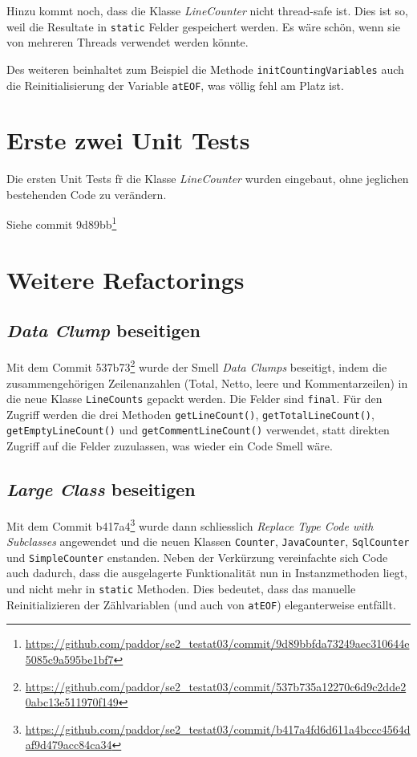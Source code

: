 \documentclass[a4paper]{article}
\newcommand{\java}[1]{\lstinline[style=customjava]{#1}} %
\begin{document}
Hinzu kommt noch, dass die Klasse \emph{LineCounter} nicht thread-safe ist.
Dies ist so, weil die Resultate in \java{static} Felder gespeichert werden. Es
w\"are sch\"on, wenn sie von mehreren Threads verwendet werden k\"onnte.

Des weiteren beinhaltet zum Beispiel die Methode \java{initCountingVariables}
auch die Reinitialisierung der Variable \java{atEOF}, was v\"ollig fehl am
Platz ist.

\section{Erste zwei Unit Tests}
Die ersten Unit Tests f\"r die Klasse \emph{LineCounter} wurden eingebaut, ohne jeglichen bestehenden Code zu ver\"andern.

Siehe commit 9d89bb\footnote{\url{https://github.com/paddor/se2_testat03/commit/9d89bbfda73249aec310644e5085c9a595be1bf7}}

\section{Weitere Refactorings}

\subsection{\emph{Data Clump} beseitigen}
Mit dem Commit
537b73\footnote{\url{https://github.com/paddor/se2_testat03/commit/537b735a12270c6d9c2dde20abc13e511970f149}}
wurde der Smell \emph{Data Clumps} beseitigt, indem die zusammengeh\"origen
Zeilenanzahlen (Total, Netto, leere und Kommentarzeilen) in die neue Klasse
\java{LineCounts} gepackt werden. Die Felder sind \java{final}. F\"ur den
Zugriff werden die drei Methoden \java{getLineCount()},
\java{getTotalLineCount()}, \java{getEmptyLineCount()} und
\java{getCommentLineCount()} verwendet, statt direkten Zugriff auf die Felder
zuzulassen, was wieder ein Code Smell w\"are.

\subsection{\emph{Large Class} beseitigen}
Mit dem Commit
b417a4\footnote{\url{https://github.com/paddor/se2_testat03/commit/b417a4fd6d611a4bccc4564daf9d479acc84ca34}}
wurde dann schliesslich \emph{Replace Type Code with Subclasses} angewendet und
die neuen Klassen \java{Counter}, \java{JavaCounter}, \java{SqlCounter} und
\java{SimpleCounter} enstanden. Neben der Verk\"urzung vereinfachte sich Code
auch dadurch, dass die ausgelagerte Funktionalit\"at nun in Instanzmethoden
liegt, und nicht mehr in \java{static} Methoden. Dies bedeutet, dass das
manuelle Reinitializieren der Z\"ahlvariablen (und auch von \java{atEOF})
eleganterweise entf\"allt.
\end{document}
